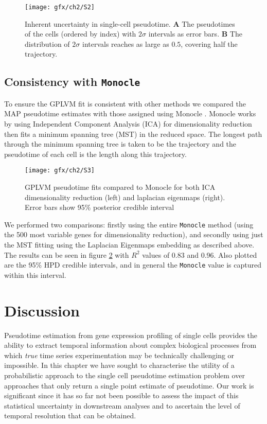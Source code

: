 \begin{figure}
\centering
	\texttt{[image: gfx/ch2/S2]}
\caption[Inherent uncertainty in single-cell pseudotime.]{Inherent uncertainty in single-cell pseudotime. \textbf{A} The pseudotimes of the cells (ordered by index) with $2 \sigma$ intervals as error bars. \textbf{B} The distribution of $2\sigma$ intervals reaches as large as $0.5$, covering half the trajectory.} \label{fig:s2}
\end{figure}

\subsection{Consistency with \texttt{Monocle}}
To ensure the GPLVM fit is consistent with other methods we compared the MAP pseudotime estimates with those assigned using Monocle \cite{Trapnell2014-xi}. Monocle works by using Independent Component Analysis (ICA) for dimensionality reduction then fits a minimum spanning tree (MST) in the reduced space. The longest path through the minimum spanning tree is taken to be the trajectory and the pseudotime of each cell is the length along this trajectory.

\begin{figure}
\centering
	\texttt{[image: gfx/ch2/S3]}
\caption[Comparison of GPLVM pseudotime fits.]{GPLVM pseudotime fits compared to Monocle for both ICA dimensionality reduction (left) and laplacian eigenmaps (right). Error bars show 95\% posterior credible interval} \label{fig:s3}
\end{figure}

We performed two comparisons: firstly using the entire \texttt{Monocle} method (using the 500 most variable genes for dimensionality reduction), and secondly using just the MST fitting using the Laplacian Eigenmaps embedding as described above. The results can be seen in figure \ref{fig:s3} with $R^2$ values of 0.83 and 0.96. Also plotted are the 95\% HPD credible intervals, and in general the \texttt{Monocle} value is captured within this interval.


\section{Discussion}

Pseudotime estimation from gene expression profiling of single cells provides the ability to extract temporal information about complex biological processes from which \emph{true} time series experimentation may be technically challenging or impossible. In this chapter we have sought to characterise the utility of a probabilistic approach to the single cell pseudotime estimation problem over approaches that only return a single point estimate of pseudotime. Our work is significant since it has so far not been possible to assess the impact of this statistical uncertainty in downstream analyses and to ascertain the level of temporal resolution that can be obtained.

